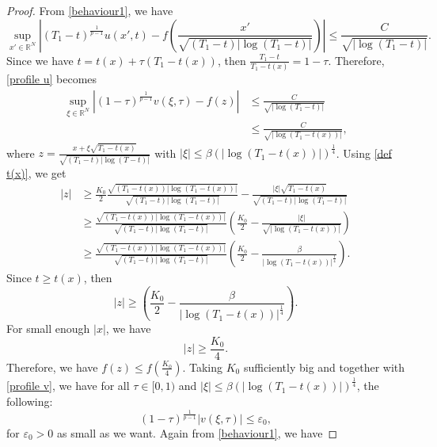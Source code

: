 \documentclass[11pt,a4paper]{article}
\newcommand{\1}{\mathbbm{1}}
\numberwithin{equation}{section}
\newcommand{\numberset}{\mathbb}
\newcommand{\R}{\numberset{R}}
\theoremstyle{remark}
\begin{document}
\begin{proof}
From \eqref{behaviour1}, we have
\begin{equation}\label{profile u}
\underset{x'\in \R^N}{\sup}\left|(T_1-t)^{\frac{1}{p-1}}u(x',t)-f\left(\frac{x'}{\sqrt{(T_1-t)|\log(T_1-t)|}}\right)\right|\leq \frac{C}{\sqrt{|\log(T_1-t)|}}.
\end{equation}
Since we have $t=t(x)+\tau (T_1-t(x))$, then $\frac{T_1-t}{T_1-t(x)}=1-\tau$. Therefore, \eqref{profile u} becomes
\begin{equation}\label{profile v}
\begin{split}
\underset{\xi\in \R^N}{\sup}\left|(1-\tau)^{\frac{1}{p-1}}v(\xi,\tau)-f\left(z\right)\right|&\leq \frac{C}{\sqrt{|\log(T_1-t)|}}\\
&\leq \frac{C}{\sqrt{|\log(T_1-t(x))|}},
\end{split}
\end{equation}
where $z=\frac{x+\xi\sqrt{T_1-t(x)}}{\sqrt{(T_1-t)|\log(T-t)|}}$ with $|\xi|\leq\beta (|\log(T_1-t(x))|)^{\frac{1}{4}}$. Using \eqref{def t(x)}, we get
\begin{equation}\label{inequality z}
\begin{split}
|z|&\geq\frac{K_0}{2}\frac{\sqrt{(T_1-t(x))|\log(T_1-t(x))|}}{\sqrt{(T_1-t)|\log(T_1-t)|}}-\frac{|\xi|\sqrt{T_1-t(x)}}{\sqrt{(T_1-t)|\log(T_1-t)|}}\\
&\geq\frac{\sqrt{(T_1-t(x))|\log(T_1-t(x))|}}{\sqrt{(T_1-t)|\log(T_1-t)|}}\left(\frac{K_0}{2}-\frac{|\xi|}{\sqrt{|\log(T_1-t(x))|}}\right)\\
&\geq \frac{\sqrt{(T_1-t(x))|\log(T_1-t(x))|}}{\sqrt{(T_1-t)|\log(T_1-t)|}}\left(\frac{K_0}{2}-\frac{\beta}{|\log(T_1-t(x))|^{\frac{1}{4}}}\right).
\end{split}
\end{equation}
Since $t\geq t(x)$, then
\begin{equation}\label{z > K_0 beta}
|z|\geq \left(\frac{K_0}{2}-\frac{\beta}{|\log(T_1-t(x))|^{\frac{1}{4}}}\right).
\end{equation}
For small enough $|x|$, we have 
$$|z|\geq \frac{K_0}{4}.$$
Therefore, we have $f(z)\leq f(\frac{K_0}{4})$. Taking $K_0$ sufficiently big and together with \eqref{profile v}, we have for all $\tau \in [0,1)$ and $|\xi|\leq\beta (|\log(T_1-t(x))|)^{\frac{1}{4}}$, the following:
\begin{equation}\label{rough bound v}
(1-\tau)^{\frac{1}{p-1}}|v(\xi,\tau)|\leq \varepsilon_0,
\end{equation}
for $\varepsilon_0>0$ as small as we want. Again from \eqref{behaviour1}, we have

\end{proof}
\end{document}
